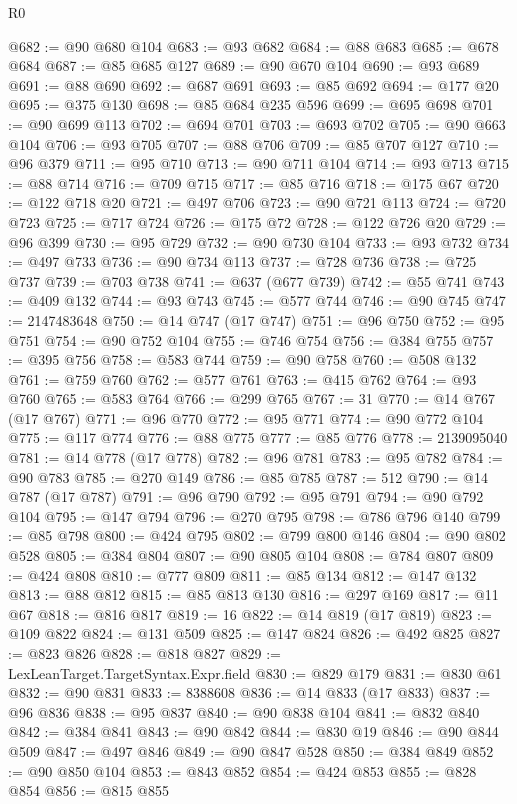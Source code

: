 \begin{lexlean}{R0}
\begin{coremodule}
@682 := @90 @680 @104
@683 := @93 @682
@684 := @88 @683
@685 := @678 @684
@687 := @85 @685 @127
@689 := @90 @670 @104
@690 := @93 @689
@691 := @88 @690
@692 := @687 @691
@693 := @85 @692
@694 := @177 @20
@695 := @375 @130
@698 := @85 @684 @235 @596
@699 := @695 @698
@701 := @90 @699 @113
@702 := @694 @701
@703 := @693 @702
@705 := @90 @663 @104
@706 := @93 @705
@707 := @88 @706
@709 := @85 @707 @127
@710 := @96 @379
@711 := @95 @710
@713 := @90 @711 @104
@714 := @93 @713
@715 := @88 @714
@716 := @709 @715
@717 := @85 @716
@718 := @175 @67
@720 := @122 @718 @20
@721 := @497 @706
@723 := @90 @721 @113
@724 := @720 @723
@725 := @717 @724
@726 := @175 @72
@728 := @122 @726 @20
@729 := @96 @399
@730 := @95 @729
@732 := @90 @730 @104
@733 := @93 @732
@734 := @497 @733
@736 := @90 @734 @113
@737 := @728 @736
@738 := @725 @737
@739 := @703 @738
@741 := @637 (@677 @739)
@742 := @55 @741
@743 := @409 @132
@744 := @93 @743
@745 := @577 @744
@746 := @90 @745
@747 := 2147483648
@750 := @14 @747 (@17 @747)
@751 := @96 @750
@752 := @95 @751
@754 := @90 @752 @104
@755 := @746 @754
@756 := @384 @755
@757 := @395 @756
@758 := @583 @744
@759 := @90 @758
@760 := @508 @132
@761 := @759 @760
@762 := @577 @761
@763 := @415 @762
@764 := @93 @760
@765 := @583 @764
@766 := @299 @765
@767 := 31
@770 := @14 @767 (@17 @767)
@771 := @96 @770
@772 := @95 @771
@774 := @90 @772 @104
@775 := @117 @774
@776 := @88 @775
@777 := @85 @776
@778 := 2139095040
@781 := @14 @778 (@17 @778)
@782 := @96 @781
@783 := @95 @782
@784 := @90 @783
@785 := @270 @149
@786 := @85 @785
@787 := 512
@790 := @14 @787 (@17 @787)
@791 := @96 @790
@792 := @95 @791
@794 := @90 @792 @104
@795 := @147 @794
@796 := @270 @795
@798 := @786 @796 @140
@799 := @85 @798
@800 := @424 @795
@802 := @799 @800 @146
@804 := @90 @802 @528
@805 := @384 @804
@807 := @90 @805 @104
@808 := @784 @807
@809 := @424 @808
@810 := @777 @809
@811 := @85 @134
@812 := @147 @132
@813 := @88 @812
@815 := @85 @813 @130
@816 := @297 @169
@817 := @11 @67
@818 := @816 @817
@819 := 16
@822 := @14 @819 (@17 @819)
@823 := @109 @822
@824 := @131 @509
@825 := @147 @824
@826 := @492 @825
@827 := @823 @826
@828 := @818 @827
@829 := LexLeanTarget.TargetSyntax.Expr.field
@830 := @829 @179
@831 := @830 @61
@832 := @90 @831
@833 := 8388608
@836 := @14 @833 (@17 @833)
@837 := @96 @836
@838 := @95 @837
@840 := @90 @838 @104
@841 := @832 @840
@842 := @384 @841
@843 := @90 @842
@844 := @830 @19
@846 := @90 @844 @509
@847 := @497 @846
@849 := @90 @847 @528
@850 := @384 @849
@852 := @90 @850 @104
@853 := @843 @852
@854 := @424 @853
@855 := @828 @854
@856 := @815 @855

\end{coremodule}
\end{lexlean}
